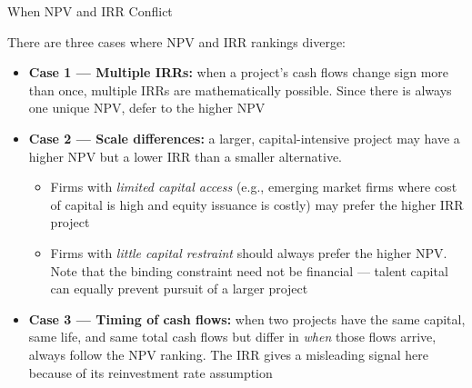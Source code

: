 \documentclass[10pt]{article}
\begin{document}
    \begin{core}[label=core:npvirrconflict]{When NPV and IRR Conflict}

      There are three cases where NPV and IRR rankings diverge:

      \begin{itemize}

        \item \textbf{Case 1 — Multiple IRRs:} when a project's cash flows change sign more than once, multiple IRRs are mathematically possible. Since there is always one unique NPV, defer to the higher NPV

        \item \textbf{Case 2 — Scale differences:} a larger, capital-intensive project may have a higher NPV but a lower IRR than a smaller alternative.
        \begin{itemize}
          \item Firms with \textit{limited capital access} (e.g., emerging market firms where cost of capital is high and equity issuance is costly) may prefer the higher IRR project
          \item Firms with \textit{little capital restraint} should always prefer the higher NPV. Note that the binding constraint need not be financial — talent capital can equally prevent pursuit of a larger project
        \end{itemize}

        \item \textbf{Case 3 — Timing of cash flows:} when two projects have the same capital, same life, and same total cash flows but differ in \textit{when} those flows arrive, always follow the NPV ranking. The IRR gives a misleading signal here because of its reinvestment rate assumption

      \end{itemize}


    \end{core}
\end{document}
